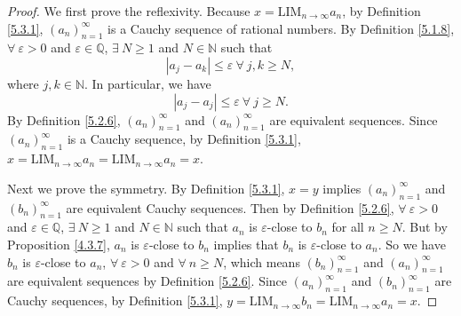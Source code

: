 \begin{proof}
We first prove the reflexivity.
Because \(x = \text{LIM}_{n \to \infty} a_n\), by Definition \ref{5.3.1}, \((a_n)_{n = 1}^{\infty}\) is a Cauchy sequence of rational numbers.
By Definition \ref{5.1.8}, \(\forall\ \varepsilon > 0\) and \(\varepsilon \in \mathds{Q}\), \(\exists\ N \geq 1\) and \(N \in \mathds{N}\) such that
\[
    |a_j - a_k| \leq \varepsilon \ \forall\ j, k \geq N,
\]
where \(j, k \in \mathds{N}\).
In particular, we have
\[
    |a_j - a_j| \leq \varepsilon \ \forall\ j \geq N.
\]
By Definition \ref{5.2.6}, \((a_n)_{n = 1}^{\infty}\) and \((a_n)_{n = 1}^{\infty}\) are equivalent sequences.
Since \((a_n)_{n = 1}^{\infty}\) is a Cauchy sequence, by Definition \ref{5.3.1}, \(x = \text{LIM}_{n \to \infty} a_n = \text{LIM}_{n \to \infty} a_n = x\).

Next we prove the symmetry.
By Definition \ref{5.3.1}, \(x = y\) implies \((a_n)_{n = 1}^{\infty}\) and \((b_n)_{n = 1}^{\infty}\) are equivalent Cauchy sequences.
Then by Definition \ref{5.2.6}, \(\forall\ \varepsilon > 0\) and \(\varepsilon \in \mathds{Q}\), \(\exists\ N \geq 1\) and \(N \in \mathds{N}\) such that \(a_n\) is \(\varepsilon\)-close to \(b_n\) for all \(n \geq N\).
But by Proposition \ref{4.3.7}, \(a_n\) is \(\varepsilon\)-close to \(b_n\) implies that \(b_n\) is \(\varepsilon\)-close to \(a_n\).
So we have \(b_n\) is \(\varepsilon\)-close to \(a_n\), \(\forall\ \varepsilon > 0\) and \(\forall\ n \geq N\), which means \((b_n)_{n = 1}^{\infty}\) and \((a_n)_{n = 1}^{\infty}\) are equivalent sequences by Definition \ref{5.2.6}.
Since \((a_n)_{n = 1}^{\infty}\) and \((b_n)_{n = 1}^{\infty}\) are Cauchy sequences, by Definition \ref{5.3.1}, \(y = \text{LIM}_{n \to \infty} b_n = \text{LIM}_{n \to \infty} a_n = x\).


\end{proof}
